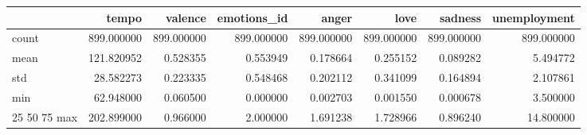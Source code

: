 \begin{tabular}{lrrrrrrr}
\toprule
 & tempo & valence & emotions_id & anger & love & sadness & unemployment \\
\midrule
count & 899.000000 & 899.000000 & 899.000000 & 899.000000 & 899.000000 & 899.000000 & 899.000000 \\
mean & 121.820952 & 0.528355 & 0.553949 & 0.178664 & 0.255152 & 0.089282 & 5.494772 \\
std & 28.582273 & 0.223335 & 0.548468 & 0.202112 & 0.341099 & 0.164894 & 2.107861 \\
min & 62.948000 & 0.060500 & 0.000000 & 0.002703 & 0.001550 & 0.000678 & 3.500000 \\
25%
50%
75%
max & 202.899000 & 0.966000 & 2.000000 & 1.691238 & 1.728966 & 0.896240 & 14.800000 \\
\bottomrule
\end{tabular}
